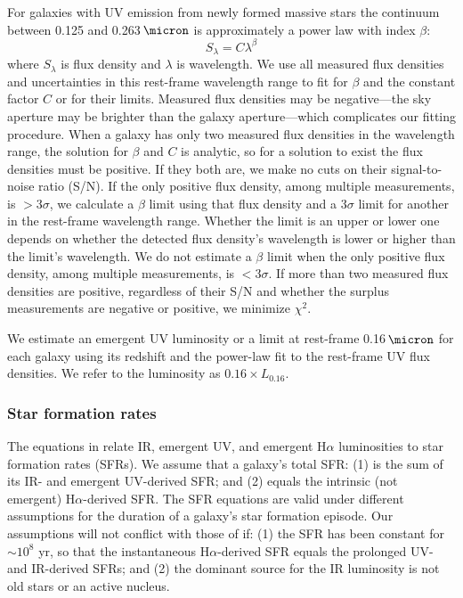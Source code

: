 \documentclass[preprint]{aastex}
\begin{document}
For galaxies with UV emission from newly formed massive stars the continuum
between 0.125 and 0.263$\,\micron$ is approximately a power law with index
$\beta$:
\begin{equation}
S_{\lambda} = C\lambda^{\beta}
\end{equation}
where $S_{\lambda}$ is flux density and $\lambda$ is wavelength.
We use all measured flux densities and uncertainties in this rest-frame
wavelength range to fit for $\beta$ and the constant factor $C$ or
for their limits.  Measured flux densities may be negative---the sky aperture
may be brighter than the galaxy aperture---which
complicates our fitting procedure.  When a galaxy has only two measured flux
densities in the wavelength range, the solution for $\beta$ and $C$ is
analytic, so for a solution to exist the flux densities must be positive.  If
they both are, we make no cuts on their signal-to-noise ratio (S/N).
If the only positive flux density, among multiple measurements, is $> 3\sigma$,
we calculate a $\beta$ limit using that flux density and a $3\sigma$ limit for
another in the rest-frame wavelength range.  Whether the limit is an upper or
lower one depends on whether the detected flux density's wavelength is lower
or higher than the limit's wavelength.  We do not estimate a $\beta$ limit when
the only positive flux density, among multiple measurements, is $< 3\sigma$.
If more than two measured flux densities are positive, regardless of their S/N
and whether the surplus measurements are negative or positive, we minimize
$\chi^{2}$.

We estimate an emergent UV luminosity or a
limit at rest-frame 0.16$\,\micron$ for each galaxy using its redshift and
the power-law fit to the rest-frame UV flux densities.  We refer to the
luminosity as $0.16 \times L_{0.16}$.

\subsubsection{Star formation rates}\label{sfrs}

The equations in \citet{kennicutt98} relate IR, emergent UV, and emergent
H$\alpha$ luminosities to star formation rates (SFRs).  We assume
that a galaxy's total SFR: (1) is the sum of its IR- and emergent UV-derived
SFR; and (2) equals the intrinsic (not emergent)
H$\alpha$-derived SFR.  The SFR equations are valid under different assumptions
for the duration of a galaxy's star formation episode.  Our assumptions will not
conflict with those of \citet{kennicutt98} if: (1) the SFR has been
constant for $\sim 10^{8}$ yr, so that the instantaneous H$\alpha$-derived SFR
equals the prolonged UV- and IR-derived SFRs; and (2) the dominant
source for the IR luminosity is not old stars or an active nucleus.
\end{document}
